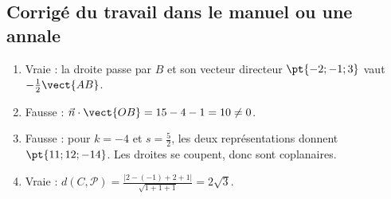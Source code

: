 \subsection{Corrigé du travail dans le manuel ou une annale}\begin{enumerate}
\item Vraie : la droite passe par $B$ et son vecteur directeur $\pt{-2;-1;3}$ vaut $-\frac12\vect{AB}$.
\item Fausse : $\vec n\cdot\vect{OB}=15-4-1=10\ne0$.
\item Fausse : pour $k=-4$ et $s=\frac52$, les deux représentations donnent $\pt{11;12;-14}$. Les droites se coupent, donc sont coplanaires.
\item Vraie : $d(C,\mathcal P)=\frac{|2-(-1)+2+1|}{\sqrt{1+1+1}}=2\sqrt3$.
\end{enumerate}

\fi

